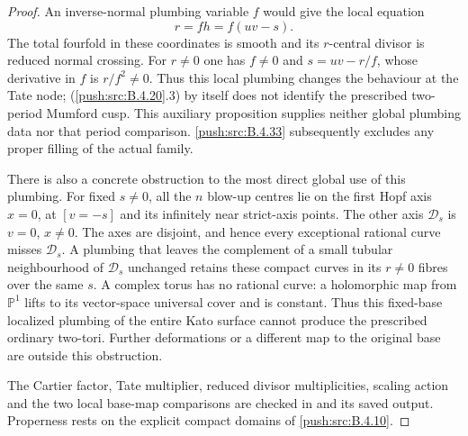 \begin{proof}
An inverse-normal plumbing variable $f$ would
give the local equation
\[
 r=fh=f(uv-s).
 \tag{B.4.20.3}
\]
The total fourfold in these coordinates is
smooth and its $r$-central divisor is reduced
normal crossing. For $r\ne0$ one has $f\ne0$
and $s=uv-r/f$, whose derivative in $f$ is
$r/f^2\ne0$. Thus this local plumbing changes
the behaviour at the Tate node; (\ref{push:src:B.4.20}.3) by
itself does not identify the prescribed two-period
Mumford cusp. This auxiliary proposition supplies neither
global plumbing data nor that period comparison. \ref{push:src:B.4.33}
subsequently excludes any proper filling of the actual family.

There is also a concrete obstruction to the most
direct global use of this plumbing. For fixed
$s\ne0$, all the $n$ blow-up centres lie on the
first Hopf axis $x=0$, at $[v=-s]$ and its
infinitely near strict-axis points. The other
axis $\mathcal D_s$ is $v=0$, $x\ne0$.
The axes are disjoint, and hence every exceptional
rational curve misses $\mathcal D_s$. A plumbing
that leaves the complement of a small tubular
neighbourhood of $\mathcal D_s$ unchanged retains
these compact curves in its $r\ne0$ fibres over
the same $s$. A complex torus has no rational
curve: a holomorphic map from $\mathbb P^1$
lifts to its vector-space universal cover and
is constant. Thus this fixed-base localized
plumbing of the entire Kato surface cannot
produce the prescribed ordinary two-tori.
Further deformations or a different map to the
original base are outside this obstruction.

The Cartier factor, Tate multiplier, reduced
divisor multiplicities, scaling action and the
two local base-map comparisons are checked in
 and
its saved output. Properness rests on the
explicit compact domains of \ref{push:src:B.4.10}.
\end{proof}

